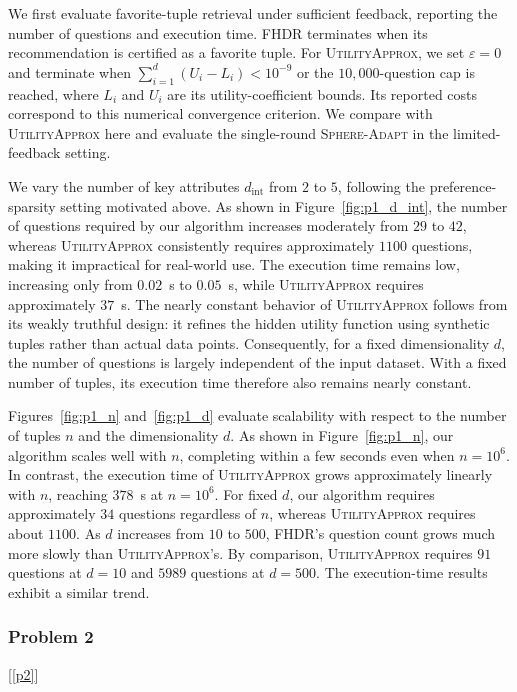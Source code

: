 \documentclass[conference]{IEEEtran}
\theoremstyle{definition}
\theoremstyle{plain}
\begin{document}
We first evaluate favorite-tuple retrieval under sufficient feedback, reporting the number of questions and execution time. FHDR terminates when its recommendation is certified as a favorite tuple. For \textsc{UtilityApprox}, we set $\varepsilon=0$ and terminate when $\sum_{i=1}^{d}(U_i-L_i)<10^{-9}$ or the $10{,}000$-question cap is reached, where $L_i$ and $U_i$ are its utility-coefficient bounds. Its reported costs correspond to this numerical convergence criterion. We compare with \textsc{UtilityApprox} here and evaluate the single-round \textsc{Sphere-Adapt} in the limited-feedback setting.

We vary the number of key attributes $d_\text{int}$ from $2$ to $5$, following the preference-sparsity setting motivated above. As shown in Figure~\ref{fig:p1_d_int}, the number of questions required by our algorithm increases moderately from $29$ to $42$, whereas \textsc{UtilityApprox} consistently requires approximately $1100$ questions, making it impractical for real-world use. The execution time remains low, increasing only from $0.02$~s to $0.05$~s, while \textsc{UtilityApprox} requires approximately $37$~s. The nearly constant behavior of \textsc{UtilityApprox} follows from its weakly truthful design: it refines the hidden utility function using synthetic tuples rather than actual data points. Consequently, for a fixed dimensionality $d$, the number of questions is largely independent of the input dataset. With a fixed number of tuples, its execution time therefore also remains nearly constant.

Figures~\ref{fig:p1_n} and~\ref{fig:p1_d} evaluate scalability with respect to the number of tuples $n$ and the dimensionality $d$. As shown in Figure~\ref{fig:p1_n}, our algorithm scales well with $n$, completing within a few seconds even when $n=10^6$. In contrast, the execution time of \textsc{UtilityApprox} grows approximately linearly with $n$, reaching $378$~s at $n=10^6$. For fixed $d$, our algorithm requires approximately $34$ questions regardless of $n$, whereas \textsc{UtilityApprox} requires about $1100$. As $d$ increases from $10$ to $500$, FHDR's question count grows much more slowly than \textsc{UtilityApprox}'s. By comparison, \textsc{UtilityApprox} requires $91$ questions at $d=10$ and $5989$ questions at $d=500$. The execution-time results exhibit a similar trend.

\subsubsection{Problem 2}[\ref{p2}]
\end{document}
